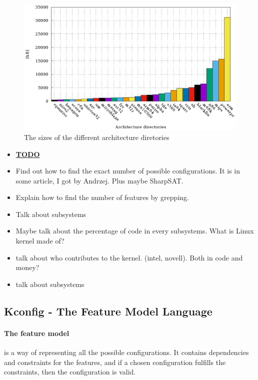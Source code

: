 \documentclass[a4paper,11pt]{article}
\newcommand{\figa}{
    \begin{figure}[!htpb]
    \centering
}
\newcommand{\figb}[2]{
    \caption{#1}
    \label{#2}
    \end{figure}
}
\begin{document}
\figa
    \includegraphics{plots/archsizes.eps}
\figb{The sizes of the different architecture diretories}{fig:archsizes}



\begin{itemize}
    \item \underline{\textbf{TODO}}
    \item Find out how to find the exact number of possible configurations. It 
        is in some article, I got by Andrzej. Plus maybe SharpSAT.
    \item Explain how to find the number of features by grepping.
    \item Talk about subsystems
    \item Maybe talk about the percentage of code in every subsystems. What is 
        Linux kernel made of?
    \item talk about who contributes to the kernel. (intel, novell). Both in 
        code and money?
    \item talk about subsystems
\end{itemize}


\subsection{Kconfig - The Feature Model Language}

\paragraph{The feature model} is a way of representing all the possible 
configurations. It contains dependencies and constraints for the features, and 
if a chosen configuration fulfills the constraints, then the configuration is 
valid.
\end{document}
